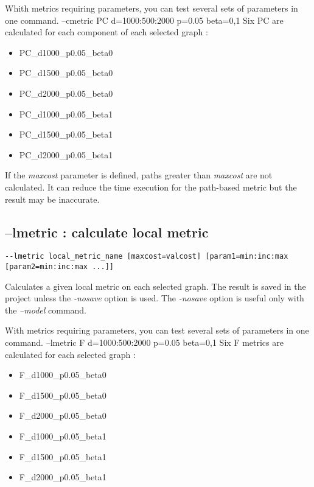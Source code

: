 \documentclass[a4paper,10pt]{report}
\newenvironment{cmd}
{\quote\Verbatim}
{\endVerbatim\endquote}
\begin{document}
Whith metrics requiring parameters, you can test several sets of parameters in one command.
\begin{cmd}
--cmetric PC d=1000:500:2000 p=0.05 beta=0,1
\end{cmd}
Six PC are calculated for each component of each selected graph :
\begin{itemize}
 \item PC\_d1000\_p0.05\_beta0
 \item PC\_d1500\_p0.05\_beta0
 \item PC\_d2000\_p0.05\_beta0
 \item PC\_d1000\_p0.05\_beta1
 \item PC\_d1500\_p0.05\_beta1
 \item PC\_d2000\_p0.05\_beta1
\end{itemize}


If the \textit{maxcost} parameter is defined, paths greater than \textit{maxcost} are not calculated. It can reduce the time execution for the path-based metric but the result may be inaccurate. 

\subsection{--lmetric : calculate local metric}
\begin{verbatim}
--lmetric local_metric_name [maxcost=valcost] [param1=min:inc:max [param2=min:inc:max ...]] 
\end{verbatim}
Calculates a given local metric on each selected graph.
The result is saved in the project unless the \textit{-nosave} option is used. The \textit{-nosave} option is useful only with the \textit{--model} command.

With metrics requiring parameters, you can test several sets of parameters in one command.
\begin{cmd}
--lmetric F d=1000:500:2000 p=0.05 beta=0,1
\end{cmd}
Six F metrics are calculated for each selected graph :
\begin{itemize}
 \item F\_d1000\_p0.05\_beta0
 \item F\_d1500\_p0.05\_beta0
 \item F\_d2000\_p0.05\_beta0
 \item F\_d1000\_p0.05\_beta1
 \item F\_d1500\_p0.05\_beta1
 \item F\_d2000\_p0.05\_beta1
\end{itemize}
\end{document}
